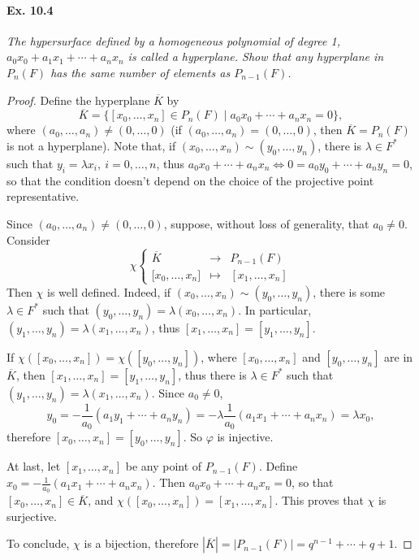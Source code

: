 \documentclass[11pt,a4paper]{article}
\begin{document}
\paragraph{Ex. 10.4} {\it The hypersurface defined by a homogeneous polynomial of degree 1, $a_0x_0+a_1x_1+\cdots +a_nx_n $ is called a hyperplane. Show that any hyperplane in $P_n(F)$ has the same number of elements as $P_{n-1}(F)$.
}
\begin{proof}
Define the hyperplane $\overline{K}$ by
$$\overline{K} = \{[x_0,\ldots,x_n] \in P_n(F) \mid a_0 x_0 + \cdots +a_n x_n = 0\},$$
where $(a_0,\ldots,a_n) \ne (0,\ldots,0)$ (if $(a_0,\ldots,a_n) = (0,\ldots,0)$, then $\overline{K} = P_n(F)$ is not a hyperplane). Note that, if $(x_0,\ldots,x_n) \sim (y_0,\ldots,y_n)$, there is $\lambda \in F^*$ such that $y_i = \lambda x_i,\ i=0,\ldots,n$, thus $a_0 x_0 + \cdots +a_n x_n \iff 0 = a_0 y_0 + \cdots +a_n y_n = 0$, so that the condition doesn't depend on the choice of the projective point representative.

Since $(a_0,\ldots,a_n) \ne (0,\ldots,0)$, suppose, without loss of generality, that $a_0 \ne 0$. Consider
$$
\chi
\left\{
\begin{array}{ccl}
\overline{K} & \to & P_{n-1}(F)\\
{[}x_0,\ldots,x_n{]} & \mapsto & [x_1,\ldots, x_n]
\end{array}
\right.
$$
Then $\chi$ is well defined. Indeed, if $(x_0,\ldots,x_n) \sim (y_0,\ldots,y_n)$, there is some $\lambda \in F^*$ such that $(y_0,\ldots, y_n) = \lambda (x_0,\ldots,x_n)$. In particular, $(y_1,\ldots, y_n) = \lambda (x_1,\ldots,x_n)$, thus $[x_1,\ldots,x_n] = [y_1,\ldots,y_n]$.

If $\chi([x_0,\ldots,x_n]) =  \chi([y_0,\ldots,y_n])$, where $[x_0,\ldots, x_n]$ and $[y_0,\ldots, y_n]$ are in $\overline{K}$, then $[x_1,\ldots, x_n] = [y_1,\ldots, y_n]$, thus there is $\lambda \in F^*$ such that $(y_1,\ldots, y_n) = \lambda (x_1,\ldots, x_n)$. Since $a_0 \ne 0$,
$$y_0 = -\frac{1}{a_0}(a_1y_1 + \cdots + a_ny_n) = - \lambda \frac{1}{a_0}(a_1x_1 + \cdots + a_nx_n) = \lambda x_0,$$
therefore $[x_0,\ldots,x_n] = [y_0,\ldots,y_n]$. So $\varphi$ is injective.

At last, let $[x_1,\ldots, x_n]$ be any point of $P_{n-1}(F)$. Define $x_0 = - \frac{1}{a_0}(a_1x_1 + \cdots + a_nx_n)$. Then $a_0x_0 + \cdots +a_nx_n = 0$, so that $[x_0,\ldots,x_n] \in \overline{K}$, and $\chi([x_0,\ldots,x_n]) = [x_1,\ldots,x_n]$. This proves that $\chi$ is surjective.

To conclude, $\chi$ is a bijection, therefore $|\overline{K}| = |P_{n-1}(F)| = q^{n-1} + \cdots+ q+1$.
\end{proof}
\end{document}
